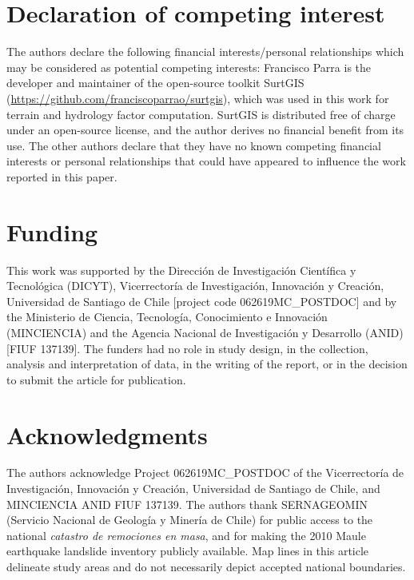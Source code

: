 \documentclass[preprint,12pt,3p,authoryear]{elsarticle}
\newcommand{\revtext}[1]{{\color{blue!70!black}#1}}
\begin{document}
\section*{Declaration of competing interest}
\revtext{The authors declare the following financial interests/personal relationships which may be considered as potential competing interests: Francisco Parra is the developer and maintainer of the open-source toolkit SurtGIS (\url{https://github.com/franciscoparrao/surtgis}), which was used in this work for terrain and hydrology factor computation. SurtGIS is distributed free of charge under an open-source license, and the author derives no financial benefit from its use. The other authors declare that they have no known competing financial interests or personal relationships that could have appeared to influence the work reported in this paper.}

\section*{Funding}
\revtext{This work was supported by the Direcci\'on de Investigaci\'on Cient\'ifica y Tecnol\'ogica (DICYT), Vicerrector\'ia de Investigaci\'on, Innovaci\'on y Creaci\'on, Universidad de Santiago de Chile [project code 062619MC\_POSTDOC] and by the Ministerio de Ciencia, Tecnolog\'ia, Conocimiento e Innovaci\'on (MINCIENCIA) and the Agencia Nacional de Investigaci\'on y Desarrollo (ANID) [FIUF 137139]. The funders had no role in study design, in the collection, analysis and interpretation of data, in the writing of the report, or in the decision to submit the article for publication.}

\section*{Acknowledgments}
\revtext{The authors acknowledge Project 062619MC\_POSTDOC of the Vicerrector\'ia de Investigaci\'on, Innovaci\'on y Creaci\'on, Universidad de Santiago de Chile, and MINCIENCIA ANID FIUF 137139.} The authors thank SERNAGEOMIN (Servicio Nacional de Geolog\'ia y Miner\'ia de Chile) for public access to the national \emph{catastro de remociones en masa}, and \citet{serey2019maule} for making the 2010 Maule earthquake landslide inventory publicly available. Map lines in this article delineate study areas and do not necessarily depict accepted national boundaries.
\end{document}
